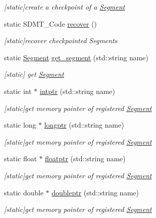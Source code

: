 \begin{DoxyCompactItemize}
\begin{DoxyCompactList}\small\item\em \mbox{[}static\mbox{]}create a checkpoint of a \hyperlink{struct_s_d_m_t_1_1_segment}{Segment} \end{DoxyCompactList}\item 
static S\+D\+M\+T\+\_\+\+Code \hyperlink{class_s_d_m_t_a3a3723f019f53a371c2c3b49efbed0f5}{recover} ()
\begin{DoxyCompactList}\small\item\em \mbox{[}static\mbox{]}recover checkpointed Segments \end{DoxyCompactList}\item 
static \hyperlink{struct_s_d_m_t_1_1_segment}{Segment} \hyperlink{class_s_d_m_t_a8dfbf78068663cc21ff1e7f15fca6e55}{get\+\_\+segment} (std\+::string name)
\begin{DoxyCompactList}\small\item\em \mbox{[}static\mbox{]} get \hyperlink{struct_s_d_m_t_1_1_segment}{Segment} \end{DoxyCompactList}\item 
static int $\ast$ \hyperlink{class_s_d_m_t_a31a70a690a9215643afaf9ef1abb35f1}{intptr} (std\+::string name)
\begin{DoxyCompactList}\small\item\em \mbox{[}static\mbox{]}get memory pointer of registered \hyperlink{struct_s_d_m_t_1_1_segment}{Segment} \end{DoxyCompactList}\item 
static long $\ast$ \hyperlink{class_s_d_m_t_ac36749f096dc877e0ff4bbd7370eebe6}{longptr} (std\+::string name)
\begin{DoxyCompactList}\small\item\em \mbox{[}static\mbox{]}get memory pointer of registered \hyperlink{struct_s_d_m_t_1_1_segment}{Segment} \end{DoxyCompactList}\item 
static float $\ast$ \hyperlink{class_s_d_m_t_a44a9454c55626de3cf5e9b37b9016d6c}{floatptr} (std\+::string name)
\begin{DoxyCompactList}\small\item\em \mbox{[}static\mbox{]}get memory pointer of registered \hyperlink{struct_s_d_m_t_1_1_segment}{Segment} \end{DoxyCompactList}\item 
static double $\ast$ \hyperlink{class_s_d_m_t_ab51288f0cabdd3a1ff1db6920c1096f7}{doubleptr} (std\+::string name)
\begin{DoxyCompactList}\small\item\em \mbox{[}static\mbox{]}get memory pointer of registered \hyperlink{struct_s_d_m_t_1_1_segment}{Segment} \end{DoxyCompactList}\end{DoxyCompactItemize}


